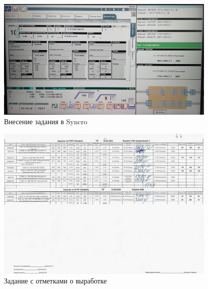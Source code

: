 \begin{figure}
\begin{center}
  \includegraphics[height=0.94\textheight, width=0.94\textwidth, keepaspectratio]{Pics 1/5 Ввод в синхро.jpg }
\end{center}
  \caption{Внесение задания в Syncro}
  \label{pic:5 Ввод в синхро}
\end{figure}

\begin{figure}
\begin{center}
  \includegraphics[height=0.94\textheight, width=0.94\textwidth, keepaspectratio]{Pics 1/4.4 задание с отметкой выработки_0001.jpg}
\end{center}
  \caption{Задание с отметками о выработке}
  \label{pic:4.4 задание с отметкой выработки_0001}
\end{figure}

